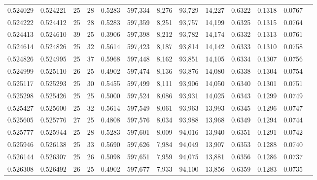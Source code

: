 \begin{tabular}{rrrrrrrrrrrrr}
0.524029 & 0.524221 &    25 &  28 &                                     0.5283 & 597,334 &   8,276 &  93,729 &  14,227 & 0.6322 & 0.1318 & 0.0767 \\
0.524222 & 0.524412 &    25 &  28 &                                     0.5283 & 597,359 &   8,251 &  93,757 &  14,199 & 0.6325 & 0.1315 & 0.0764 \\
0.524413 & 0.524610 &    39 &  25 &                                     0.3906 & 597,398 &   8,212 &  93,782 &  14,174 & 0.6332 & 0.1313 & 0.0761 \\
0.524614 & 0.524826 &    25 &  32 &                                     0.5614 & 597,423 &   8,187 &  93,814 &  14,142 & 0.6333 & 0.1310 & 0.0758 \\
0.524826 & 0.524995 &    25 &  37 &                                     0.5968 & 597,448 &   8,162 &  93,851 &  14,105 & 0.6334 & 0.1307 & 0.0756 \\
0.524999 & 0.525110 &    26 &  25 &                                     0.4902 & 597,474 &   8,136 &  93,876 &  14,080 & 0.6338 & 0.1304 & 0.0754 \\
0.525117 & 0.525293 &    25 &  30 &                                     0.5455 & 597,499 &   8,111 &  93,906 &  14,050 & 0.6340 & 0.1301 & 0.0751 \\
0.525298 & 0.525426 &    25 &  25 &                                     0.5000 & 597,524 &   8,086 &  93,931 &  14,025 & 0.6343 & 0.1299 & 0.0749 \\
0.525427 & 0.525600 &    25 &  32 &                                     0.5614 & 597,549 &   8,061 &  93,963 &  13,993 & 0.6345 & 0.1296 & 0.0747 \\
0.525605 & 0.525776 &    27 &  25 &                                     0.4808 & 597,576 &   8,034 &  93,988 &  13,968 & 0.6349 & 0.1294 & 0.0744 \\
0.525777 & 0.525944 &    25 &  28 &                                     0.5283 & 597,601 &   8,009 &  94,016 &  13,940 & 0.6351 & 0.1291 & 0.0742 \\
0.525946 & 0.526138 &    25 &  33 &                                     0.5690 & 597,626 &   7,984 &  94,049 &  13,907 & 0.6353 & 0.1288 & 0.0740 \\
0.526144 & 0.526307 &    25 &  26 &                                     0.5098 & 597,651 &   7,959 &  94,075 &  13,881 & 0.6356 & 0.1286 & 0.0737 \\
0.526308 & 0.526492 &    26 &  25 &                                     0.4902 & 597,677 &   7,933 &  94,100 &  13,856 & 0.6359 & 0.1283 & 0.0735 \\

\end{tabular}
